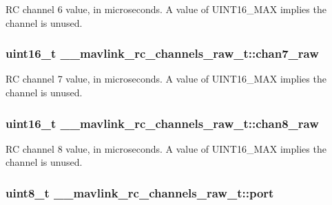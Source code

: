 R\+C channel 6 value, in microseconds. A value of U\+I\+N\+T16\+\_\+\+M\+A\+X implies the channel is unused. 

\hypertarget{struct____mavlink__rc__channels__raw__t_a6cccd33a0b2b888a3671e66e0c88d799}{
\subsubsection[{chan7\+\_\+raw}]{\setlength{\rightskip}{0pt plus 5cm}uint16\+\_\+t \+\_\+\+\_\+mavlink\+\_\+rc\+\_\+channels\+\_\+raw\+\_\+t\+::chan7\+\_\+raw}}\label{struct____mavlink__rc__channels__raw__t_a6cccd33a0b2b888a3671e66e0c88d799}


R\+C channel 7 value, in microseconds. A value of U\+I\+N\+T16\+\_\+\+M\+A\+X implies the channel is unused. 

\hypertarget{struct____mavlink__rc__channels__raw__t_ac4181e5b2c297dbe24431a4ca1d1493e}{
\subsubsection[{chan8\+\_\+raw}]{\setlength{\rightskip}{0pt plus 5cm}uint16\+\_\+t \+\_\+\+\_\+mavlink\+\_\+rc\+\_\+channels\+\_\+raw\+\_\+t\+::chan8\+\_\+raw}}\label{struct____mavlink__rc__channels__raw__t_ac4181e5b2c297dbe24431a4ca1d1493e}


R\+C channel 8 value, in microseconds. A value of U\+I\+N\+T16\+\_\+\+M\+A\+X implies the channel is unused. 

\hypertarget{struct____mavlink__rc__channels__raw__t_a3d166207003ffe9bfc68b3461ae1f03c}{
\subsubsection[{port}]{\setlength{\rightskip}{0pt plus 5cm}uint8\+\_\+t \+\_\+\+\_\+mavlink\+\_\+rc\+\_\+channels\+\_\+raw\+\_\+t\+::port}}\label{struct____mavlink__rc__channels__raw__t_a3d166207003ffe9bfc68b3461ae1f03c}


